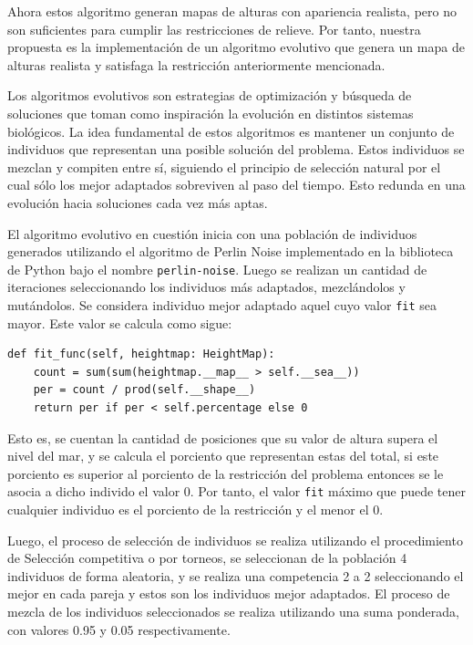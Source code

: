 Ahora estos algoritmo generan mapas de alturas con apariencia realista, pero no son suficientes para cumplir las restricciones de relieve. Por tanto, nuestra propuesta es la implementación de un algoritmo evolutivo que genera un mapa de alturas realista y satisfaga la restricción anteriormente mencionada.

Los algoritmos evolutivos son estrategias de optimización y búsqueda de soluciones que toman como inspiración la evolución en distintos sistemas biológicos. La idea fundamental de estos algoritmos es mantener un conjunto de individuos que representan una posible solución del problema. Estos individuos se mezclan y compiten entre sí, siguiendo el principio de selección natural por el cual sólo los mejor adaptados sobreviven al paso del tiempo. Esto redunda en una evolución hacia soluciones cada vez más aptas. 

El algoritmo evolutivo en cuestión inicia con una población de individuos generados utilizando el algoritmo de Perlin Noise implementado en la biblioteca de Python bajo el nombre \verb|perlin-noise|.	Luego se realizan un cantidad de iteraciones seleccionando los individuos más adaptados, mezclándolos y mutándolos.  Se considera individuo mejor adaptado aquel cuyo valor \verb|fit| sea mayor. Este valor se calcula como sigue:

\begin{verbatim}
def fit_func(self, heightmap: HeightMap):
    count = sum(sum(heightmap.__map__ > self.__sea__))
    per = count / prod(self.__shape__)
    return per if per < self.percentage else 0
\end{verbatim}

Esto es, se cuentan la cantidad de posiciones que su valor de altura supera el nivel del mar, y se calcula el porciento que representan estas del total, si este porciento es superior al porciento de la restricción del problema entonces se le asocia a dicho individo el valor 0.  Por tanto, el valor \verb|fit| máximo que puede tener cualquier individuo es el porciento de la restricción y el menor el 0.

Luego, el proceso de selección de individuos se realiza utilizando el procedimiento de Selección competitiva o por torneos, se seleccionan de la población 4 individuos de forma aleatoria, y se realiza una competencia 2 a 2 seleccionando el mejor en cada pareja y estos son los individuos mejor adaptados. El proceso de mezcla de los individuos seleccionados se realiza utilizando una suma ponderada, con valores 0.95 y 0.05 respectivamente. 

